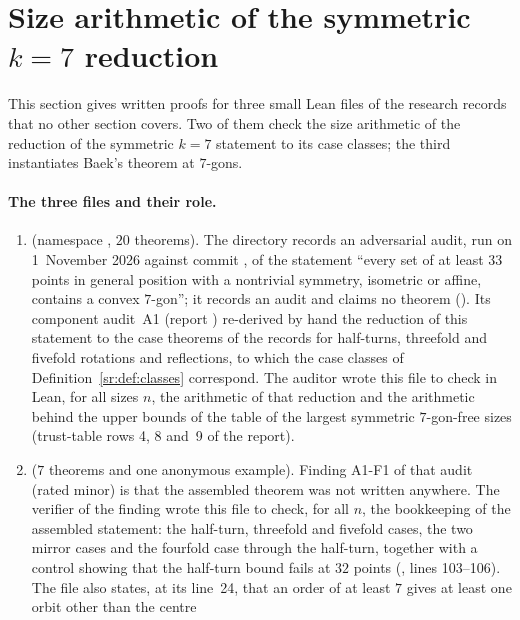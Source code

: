 \section{Size arithmetic of the symmetric \texorpdfstring{$k=7$}{k=7} reduction}\label{sa:sec}

This section gives written proofs for three small Lean files of the research records that no other section covers.
Two of them check the size arithmetic of the reduction of the symmetric $k=7$ statement to its case classes; the third
instantiates Baek's theorem at $7$-gons.

\paragraph{The three files and their role.}
\begin{enumerate}[label=(\arabic*)]
\item {} (namespace , $20$ theorems). The directory 
  records an adversarial audit, run on 1~November 2026 against commit , of the statement ``every set
  of at least $33$ points in general position with a nontrivial symmetry, isometric or affine, contains a convex
  $7$-gon''; it records an audit and claims no theorem (). Its component audit~A1 (report
  ) re-derived by hand the reduction of this statement to the case theorems of
  the records for half-turns, threefold and fivefold rotations and reflections, to which the case classes of
  Definition~\ref{sr:def:classes} correspond. The auditor wrote this file to check in Lean, for all sizes $n$, the
  arithmetic of that reduction and the arithmetic behind the upper bounds of the table of the largest symmetric
  $7$-gon-free sizes (trust-table rows 4, 8 and~9 of the report).
\item {} ($7$ theorems and one anonymous example). Finding
  A1-F1 of that audit (rated minor) is that the assembled theorem was not written anywhere. The verifier of the
  finding wrote this file to check, for all $n$, the bookkeeping of the assembled statement: the half-turn, threefold
  and fivefold cases, the two mirror cases and the fourfold case through the half-turn, together with a control
  showing that the half-turn bound fails at $32$ points (, lines 103--106). The
  file also states, at its line~24, that an order of at least $7$ gives at least one orbit other than the centre

\end{enumerate}
